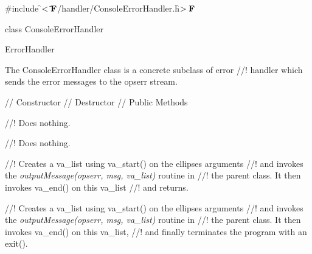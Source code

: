 
\indent \#include \f$<\tilde{ }{\bf F}$/handler/ConsoleErrorHandler.h\f$>{\bf F}$

\indent class ConsoleErrorHandler

\indent ErrorHandler
\indent{}

\indent The ConsoleErrorHandler class is a concrete subclass of error
//! handler which sends the error messages to the opserr stream.

\indent // Constructor
\indent // Destructor
\indent // Public Methods

//! Does nothing.

//! Does nothing.

//! Creates a va\_list using va\_start() on the ellipses arguments
//! and invokes the {\em outputMessage(opserr, msg, va\_list)} routine in
//! the parent class. It then invokes  va\_end() on this va\_list
//! and returns. 

//! Creates a va\_list using va\_start() on the ellipses arguments
//! and invokes the {\em outputMessage(opserr, msg, va\_list)} routine in
//! the parent class. It then invokes va\_end() on this va\_list,
//! and finally terminates the program with an exit(). 
